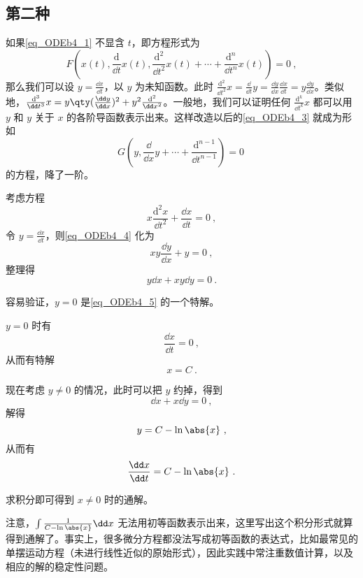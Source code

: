 \subsection{第二种}

如果\autoref{eq_ODEb4_1} 不显含 $t$，即方程形式为
\begin{equation}\label{eq_ODEb4_3}
F(x(t), \frac{\mathrm{d}}{\dd t}x(t), \frac{\mathrm{d}^2}{\dd t^2}x(t)+\cdots+\frac{\mathrm{d}^n}{\dd t^n}x(t))=0~,
\end{equation}
那么我们可以设 $y=\frac{\dd x}{\dd t}$，以 $y$ 为未知函数。此时 $\frac{\mathrm{d}^2}{\dd t^2}x=\frac{\dd}{\dd t}y=\frac{\dd y}{\dd x}\frac{\dd x}{\dd t}=y\frac{\dd y}{\dd x}$。类似地，$\frac{\mathrm{d}^3}{\dd t^3}x=y\qty(\frac{\dd y}{\dd x})^2+y^2\frac{\mathrm{d}^2}{\dd x^2}$。一般地，我们可以证明任何 $\frac{\mathrm{d}^k}{\dd t^k}x$ 都可以用 $y$ 和 $y$ 关于 $x$ 的各阶导函数表示出来。这样改造以后的\autoref{eq_ODEb4_3} 就成为形如
\begin{equation}
G(y, \frac{\dd}{\dd x}y+\cdots+\frac{\mathrm{d}^{n-1}}{\dd t^{n-1}})=0~
\end{equation}
的方程，降了一阶。

\begin{example}{}
考虑方程
\begin{equation}\label{eq_ODEb4_4}
x\frac{\mathrm{d}^2 x}{\dd t^2}+\frac{\dd x}{\dd t}=0~,
\end{equation}
令 $y=\frac{\dd x}{\dd t}$，则\autoref{eq_ODEb4_4} 化为
\begin{equation}\label{eq_ODEb4_5}
xy\frac{\dd y}{\dd x}+y=0~,
\end{equation}
整理得
\begin{equation}
y\dd x+xy\dd y=0~.
\end{equation}

容易验证，$y=0$ 是\autoref{eq_ODEb4_5} 的一个特解。

$y=0$ 时有
\begin{equation}
\frac{\dd x}{\dd t}=0~,
\end{equation}
从而有特解
\begin{equation}
x=C~.
\end{equation}

现在考虑 $y\neq 0$ 的情况，此时可以把 $y$ 约掉，得到
\begin{equation}\label{eq_ODEb4_6}
\dd x+x\dd y=0~,
\end{equation}
解得
\begin{equation}
y=C-\ln\abs{x}~,
\end{equation}
从而有
\begin{equation}
\frac{\dd x}{\dd t}=C-\ln\abs{x}~.
\end{equation}

求积分即可得到 $x\neq 0$ 时的通解。

注意，$\int\frac{1}{C-\ln\abs{x}}\dd x$ 无法用初等函数表示出来，这里写出这个积分形式就算得到通解了。事实上，很多微分方程都没法写成初等函数的表达式，比如最常见的单摆运动方程（未进行线性近似的原始形式），因此实践中常注重数值计算，以及相应的解的稳定性问题。

\end{example}


